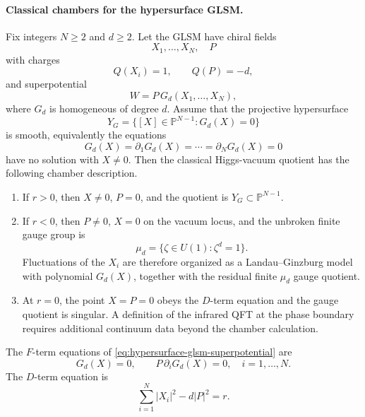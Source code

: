 \paragraph{Classical chambers for the hypersurface GLSM.}
Fix integers \(N\geq2\) and \(d\geq2\).  Let the GLSM have chiral fields
\[
  X_1,\ldots,X_N,\quad P
\]
with charges
\begin{equation}
  Q(X_i)=1,\qquad Q(P)=-d,
  \label{eq:hypersurface-glsm-charges}
\end{equation}
and superpotential
\begin{equation}
  W=P\,G_d(X_1,\ldots,X_N),
  \label{eq:hypersurface-glsm-superpotential}
\end{equation}
where \(G_d\) is homogeneous of degree \(d\).  Assume that the projective
hypersurface
\begin{equation}
  Y_G=\{[X]\in\mathbb P^{N-1}:G_d(X)=0\}
  \label{eq:projective-hypersurface-phase-target}
\end{equation}
is smooth, equivalently the equations
\[
  G_d(X)=\partial_1G_d(X)=\cdots=\partial_NG_d(X)=0
\]
have no solution with \(X\neq0\).  Then the classical Higgs-vacuum quotient
has the following chamber description.
\begin{enumerate}
\item If \(r>0\), then \(X\neq0\), \(P=0\), and the quotient is
  \(Y_G\subset\mathbb P^{N-1}\).
\item If \(r<0\), then \(P\neq0\), \(X=0\) on the vacuum locus, and the
  unbroken finite gauge group is
  \[
    \mu_d=\{\zeta\in U(1):\zeta^d=1\}.
  \]
  Fluctuations of the \(X_i\) are therefore organized as a Landau--Ginzburg
  model with polynomial \(G_d(X)\), together with the residual finite
  \(\mu_d\) gauge quotient.
\item At \(r=0\), the point \(X=P=0\) obeys the \(D\)-term equation and the
  gauge quotient is singular.  A definition of the infrared QFT at the phase
  boundary requires additional continuum data beyond the chamber
  calculation.
\end{enumerate}

The \(F\)-term equations of
\eqref{eq:hypersurface-glsm-superpotential} are
\begin{equation}
  G_d(X)=0,\qquad P\,\partial_iG_d(X)=0,\quad i=1,\ldots,N.
  \label{eq:hypersurface-glsm-f-terms}
\end{equation}
The \(D\)-term equation is
\begin{equation}
  \sum_{i=1}^N|X_i|^2-d|P|^2=r.
  \label{eq:hypersurface-glsm-d-term}
\end{equation}


